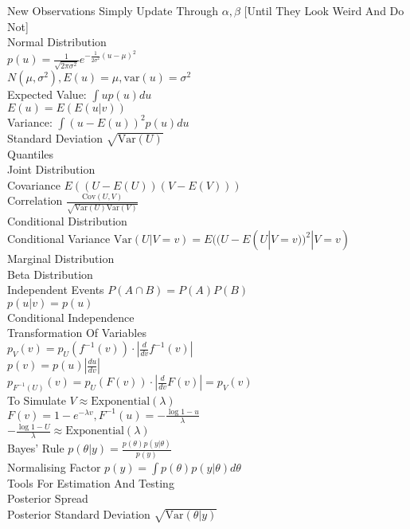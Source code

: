 New Observations Simply Update Through $\alpha,\beta$ [Until They Look Weird And Do Not] \\
Normal Distribution \\
$p(u)=\frac{1}{\sqrt{2\pi \sigma^2}}e^{-\frac{1}{2\sigma^2}(u-\mu)^2}$ \\
$N(\mu,\sigma^2), E(u)=\mu, \text{var}(u)=\sigma^2$ \\
Expected Value: $\int up(u)du$ \\
$E(u)=E(E(u|v))$ \\
Variance: $\int (u-E(u))^2p(u)du$ \\
Standard Deviation $\sqrt{\text{Var}(U)}$ \\
Quantiles \\
Joint Distribution \\
Covariance $E((U-E(U))(V-E(V)))$ \\
Correlation $\frac{\text{Cov}(U,V)}{\sqrt{\text{Var}(U)\text{Var}(V)}}$ \\
Conditional Distribution \\
Conditional Variance $\text{Var}(U|V=v)=E((U-E(U|V=v))^2|V=v)$ \\
Marginal Distribution \\
Beta Distribution \\
Independent Events $P(A \cap B)=P(A)P(B)$ \\
$p(u|v)=p(u)$ \\
Conditional Independence \\
Transformation Of Variables \\
$p_V(v)=p_U(f^{-1}(v))\cdot \left|\frac{d}{dv}f^{-1}(v) \right|$ \\
$p(v)=p(u)\left|\frac{du}{dv} \right|$ \\
$p_{F^{-1}(U)}(v)=p_U(F(v))\cdot \left|\frac{d}{dv}F(v) \right|=p_V(v)$ \\
To Simulate $V \approx \text{Exponential}(\lambda)$ \\
$F(v)=1-e^{-\lambda v}, F^{-1}(u)=-\frac{\log{1-u}}{\lambda}$ \\
$-\frac{\log{1-U}}{\lambda} \approx \text{Exponential}(\lambda)$ \\
Bayes' Rule $p(\theta|y)=\frac{p(\theta)p(y|\theta)}{p(y)}$ \\
Normalising Factor $p(y)=\int p(\theta)p(y|\theta)d\theta$ \\
Tools For Estimation And Testing \\
Posterior Spread \\
Posterior Standard Deviation $\sqrt{\text{Var}(\theta|y)}$ \\
